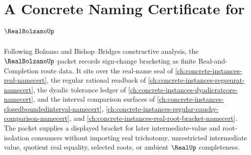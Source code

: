 \chapter{A Concrete Naming Certificate for $\RealBolzanoUp$}
\label{ch:concrete-instances-real-bolzano-namecert}

Following Bolzano and Bishop--Bridges constructive analysis, the $\RealBolzanoUp$ packet records sign-change bracketing as finite Real-and-Completion route data. It sits over the real-name seal of \autoref{ch:concrete-instances-real-namecert}, the regular rational readback of \autoref{ch:concrete-instances-regseqrat-namecert}, the dyadic tolerance ledger of \autoref{ch:concrete-instances-dyadicratcore-namecert}, and the interval comparison surfaces of \autoref{ch:concrete-instances-closedboundedinterval-namecert}, \autoref{ch:concrete-instances-regular-cauchy-comparison-namecert}, and \autoref{ch:concrete-instances-real-root-bracket-namecert}. The packet supplies a displayed bracket for later intermediate-value and root-isolation consumers without importing real trichotomy, unrestricted intermediate value, quotient real equality, selected roots, or ambient $\RealUp$ completeness.

